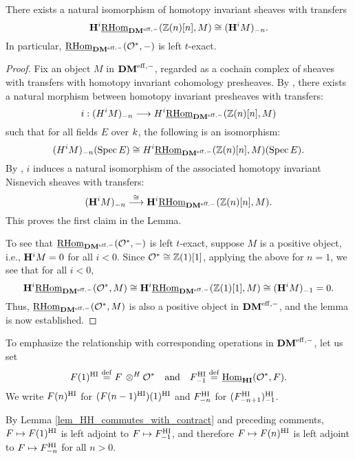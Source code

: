 \begin{lem}\label{lem_HH_commutes_with_contract}
There exists a natural isomorphism of homotopy invariant sheaves
with transfers
\[
\HH^i \ihomDMf(\Z(n)[n], M) \cong \RHI[n]{(\HH^i M)}.
\]
In particular, $\ihomDMf(\Ox, -)$ is left $t$-exact.
\end{lem}
\begin{proof}
Fix an object $M$ in $\DMeff$, regarded as a cochain complex of 
sheaves with transfers with homotopy invariant cohomology 
presheaves. By \cite[3.4.4]{DegGenMot}, there exists a natural
morphism between homotopy invariant presheaves with transfers:
\[
i : \RHI[n]{(H^i M)} \to H^i \ihomDMf(\Z(n)[n], M)
\] 
such that for all fields $E$ over $\basefield$, the following
is an isomorphism:
\[
\RHI[n]{(H^i M)}(\Spec E) \cong H^i\ihomDMf(\Z(n)[n], M)(\Spec E).
\]
By \cite[11.2]{MVW}, $i$ induces a natural isomorphism 
of the associated homotopy invariant Nisnevich sheaves with 
transfers:
\[
\RHI[n]{(\HH^i M)} \stackrel{\cong}{\to} \HH^i \ihomDMf(\Z(n)[n], 
   M).
\]
This proves the first claim in the Lemma. 

To see that $\ihomDMf(\Ox, -)$ is left $t$-exact, suppose $M$
is a positive object, i.e., $\HH^i M = 0$ for all $i < 0$. Since
$\Ox \cong \Z(1)[1]$, applying the above for $n = 1$, we see
that for all $i < 0$,
\[
\HH^i \ihomDMf(\Ox, M) \cong \HH^i \ihomDMf(\Z(1)[1], M) \cong 
   \RHI{(\HH^i M)} = 0.
\]
Thus, $\ihomDMf(\Ox, M)$ is also a positive object in $\DMeff$,
and the lemma is now established.
\end{proof}

\begin{defn}
To emphasize the relationship with corresponding operations in
$\DMeff$, let us set
\[
\LHIs{F} \defeq F \tHI \Ox \hspace{10pt} \textrm{and}\hspace{10pt} 
   \RHIs{F} \defeq \ihomHI(\Ox, F).
\]
We write $\LHIs[n]{F}$ for $\LHIs{(\LHIs[n - 1]{F})}$ and 
$\RHIs[n]{F}$ for $\RHIs{(\RHIs[n + 1]{F})}$. 
\end{defn}

By Lemma \ref{lem_HH_commutes_with_contract} and preceding 
comments, $F \mapsto \LHIs{F}$ is left adjoint to $F \mapsto 
\RHIs{F}$, and therefore $F \mapsto \LHIs[n]{F}$ is 
left adjoint to $F \mapsto \RHIs[n]{F}$ for all $n > 0$.

